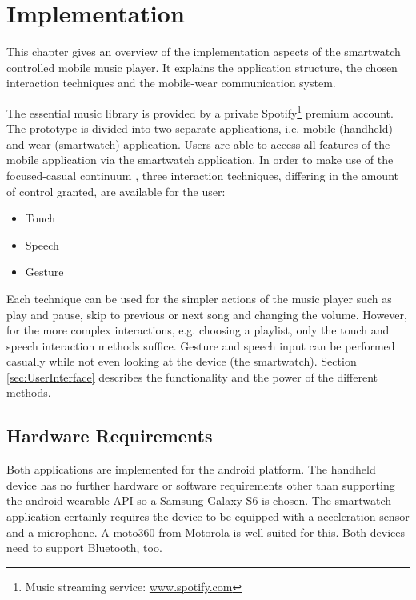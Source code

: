 \chapter{Implementation}\label{ch:implementation}

This chapter gives an overview of the implementation aspects of the smartwatch controlled mobile music player. It explains the application structure, the chosen interaction techniques and the mobile-wear communication system.

The essential music library is provided by a private Spotify\footnote{Music streaming service: \url{www.spotify.com}} premium account. The prototype is divided into two separate applications, i.e. mobile (handheld) and wear (smartwatch) application. Users are able to access all features of the mobile application via the smartwatch application. In order to make use of the focused-casual continuum \cite{pohl2013focused}, three interaction techniques, differing in the amount of control granted, are available for the user:
\begin{itemize}
\item{Touch}
\item{Speech}
\item{Gesture}
\end{itemize}
Each technique can be used for the simpler actions of the music player such as play and pause, skip to previous or next song and changing the volume. However, for the more complex interactions, e.g. choosing a playlist, only the touch and speech interaction methods suffice. Gesture and speech input can be performed casually while not even looking at the device (the smartwatch). Section \ref{sec:UserInterface} describes the functionality and the power of the different methods.

\section{Hardware Requirements}\label{sec:hardwarerequirements}
Both applications are implemented for the android platform. The handheld device has no further hardware or software requirements other than supporting the android wearable \ac{API} so a Samsung Galaxy S6 is chosen. The smartwatch application certainly requires the device to be equipped with a acceleration sensor and a microphone. A moto360 from Motorola is well suited for this. Both devices need to support Bluetooth, too.


